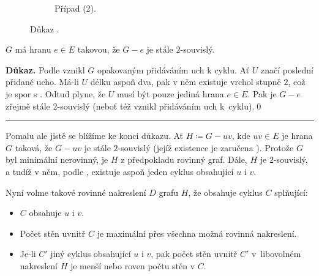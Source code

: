 \begin{enhproof}
\begin{figure}[H]
\begin{subfigure}{.45\textwidth}
   \caption{Případ (2).}
   \label{subfig:G-nema-stupen-2-pripad-2}
  \end{subfigure}
  \caption{Důkaz .}
  \label{fig:G-nema-stupen-2}
 \end{figure}

 \begin{auxilprop}
  \label{auxilprop:G-bez-uv-2-souvisly}
  $G$ má hranu $e \in E$ takovou, že $G - e$ je stále $2$-souvislý.
 \end{auxilprop}
 \textbf{\sffamily Důkaz.} Podle 
 vznikl $G$ opakovaným přidáváním uch k cyklu. Ať $U$ značí poslední přidané
 ucho. Má-li $U$ délku aspoň dva, pak v něm existuje vrchol stupně $2$, což je
 spor s . Odtud plyne, že
 $U$ musí být pouze jediná hrana $e \in E$. Pak je $G - e$ zřejmě stále
 $2$-souvislý (neboť též vznikl přidáváním uch k~cyklu).\hfill\qed\\

 \hrule

 Pomalu ale jistě se blížíme ke konci důkazu. Ať $H \coloneqq G - uv$, kde $uv
 \in E$ je hrana $G$ taková, že $G - uv$ je stále $2$-souvislý (jejíž existence
 je zaručena ). Protože
 $G$ byl minimální nerovinný, je $H$ z předpokladu rovinný graf. Dále, $H$ je
 $2$-souvislý, a tudíž v něm, podle ,
 existuje aspoň jeden cyklus obsahující $u$ i $v$.

 Nyní volme takové rovinné nakreslení $D$ grafu $H$, že obsahuje cyklus $C$
 splňující:
 \begin{itemize}
  \item $C$ obsahuje $u$ i $v$.
  \item Počet stěn uvnitř $C$ je maximální přes všechna možná rovinná
   nakreslení.
  \item Je-li $C'$ jiný cyklus obsahující $u$ i $v$, pak počet stěn uvnitř $C'$
   v~libovolném nakreslení $H$ je menší nebo roven počtu stěn v $C$.
 \end{itemize}


\end{enhproof}
